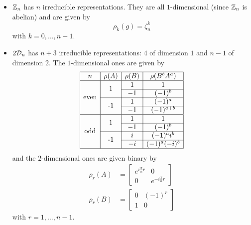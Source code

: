             \begin{itemize}
                \item $\mathbb{Z}_n$ has $n$ irreducible representations. They are all $1$-dimensional (since $\mathbb{Z}_n$ is abelian) and are given by
                \begin{equation}
                    \rho_k(g)=\zeta^k_n
                \end{equation}
                with $k=0,\dots,n-1$.
                \item $2\mathcal{D}_n$ has $n+3$ irreducible representations: $4$ of dimension $1$ and $n-1$ of dimension $2$. The $1$-dimensional ones are given by
                \begin{equation*}
                \begin{array}{|c|c|c|c|}
                    \hline
                    n & \rho(A) & \rho(B) & \rho(B^bA^a) \\
                    \hline
                    \multirow[c]{4}{*}{\text{even}} & \multirow[c]{2}{*}{1} & 1 & 1 \\ \cline{3-4}
                    & & -1 & (-1)^b \\ \cline{2-4}
                    & \multirow[c]{2}{*}{-1} & 1 & (-1)^a \\ \cline{3-4}
                    & & -1 & (-1)^{a+b} \\
                    \hline
                    \multirow[c]{4}{*}{\text{odd}} & \multirow[c]{2}{*}{1} & 1 & 1 \\ \cline{3-4}
                    & & -1 & (-1)^b \\ \cline{2-4}
                    & \multirow[c]{2}{*}{-1} & i & (-1)^ai^b \\ \cline{3-4}
                    & & -i & (-1)^a(-i)^b \\
                    \hline
                \end{array}
                \end{equation*}
                and the $2$-dimensional ones are given binary by
                \begin{align*}
                    \rho_r(A) &= 
                    \begin{bmatrix}
                        e^{i\frac{\pi}{n}r} & 0\\
                        0 & e^{-i\frac{\pi}{n}r} 
                    \end{bmatrix}\\
                    \rho_r(B) &= 
                    \begin{bmatrix}
                        0 & (-1)^r \\
                        1 & 0
                    \end{bmatrix}
                \end{align*}
                with $r=1,\dots,n-1$.
            \end{itemize}

